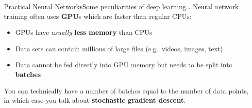 \begin{frame}{Practical Neural Networks}{Some peculiarities of deep learning\dots}
    Neural network training often uses \textbf{GPU}s which are faster than regular CPUs:

    \vfill

    \begin{itemize}
        \item GPUs have \emph{usually} \textbf{less memory} than CPUs
        \item Data sets can contain millions of large files (e.g.\ videos, images, text)
        \item Data cannot be fed directly into GPU memory but needs to be split into \textbf{batches}
    \end{itemize}

    \vfill

    \begin{center}
        
    \end{center}

    \vfill
    {\tiny You can technically have a number of batches equal to the number of data points, in which case you talk about \textbf{stochastic gradient descent}.}
\end{frame}

